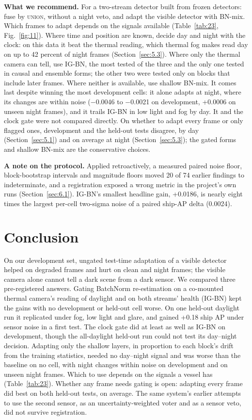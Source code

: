\documentclass[journal]{IEEEtran}
\begin{document}
\textbf{What we recommend.} For a two-stream detector built from frozen detectors: fuse by \textsc{union}, without a night veto, and adapt the visible detector with BN-mix. Which frames to adapt depends on the signals available (Table~\ref{tab:23}, Fig.~\ref{fig:11}). Where time and position are known, decide day and night with the clock: on this data it beat the thermal reading, which thermal fog makes read day on up to 42 percent of night frames (Section~\ref{sec:5.3}). Where only the thermal camera can tell, use \mbox{IG-BN}, the most tested of the three and the only one tested in causal and ensemble forms; the other two were tested only on blocks that include later frames. Where neither is available, use shallow BN-mix. It comes last despite winning the most development cells: it alone adapts at night, where its changes are within noise ($-$0.0046 to $-$0.0021 on development, +0.0006 on unseen night frames), and it trails \mbox{IG-BN} in low light and fog by day. It and the clock gate were not compared directly. On whether to adapt every frame or only flagged ones, development and the held-out tests disagree, by day (Section~\ref{sec:5.1}) and on average at night (Section~\ref{sec:5.3}); the gated forms and shallow BN-mix are the conservative choices.

\textbf{A note on the protocol.} Applied retroactively, a measured paired noise floor, block-bootstrap intervals and magnitude floors moved 20 of 74 earlier findings to indeterminate, and a registration exposed a wrong metric in the project's own runs (Section~\ref{sec:6.1}). \mbox{IG-BN}'s smallest headline gain, +0.0186, is nearly eight times the largest per-cell two-sigma noise of a paired ship-AP delta (0.0024).

\section{Conclusion}\label{sec:8}
On our development set, ungated test-time adaptation of a visible detector helped on degraded frames and hurt on clean and night frames; the visible camera alone cannot tell a dark scene from a dark sensor. We compared three pre-registered answers. Gating BatchNorm re-estimation on a co-mounted thermal camera's reading of daylight and on both streams' health (\mbox{IG-BN}) kept the gains with no development or held-out cell worse. On one held-out daylight run it replicated under fog, low light and glare, and gained +0.18 ship AP under sensor noise in a first test. The clock gate did at least as well as \mbox{IG-BN} on development, though the all-daylight held-out run could not test its day--night decision. Adapting only the shallow layers, in proportion to each block's drift from the training statistics, needed no day--night signal and was worse than the baseline on no cell, with night changes within noise on development and on unseen night frames. Which to use depends on the signals a vessel has (Table~\ref{tab:23}). Whether any frame needs gating is open: adapting every frame did best on both held-out tests, on average. The same system's earlier attempts to use the second sensor, as an uncertainty-weighted voter and as a sensor veto, did not survive registration.
\end{document}
